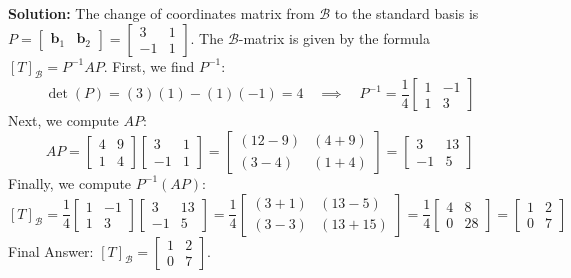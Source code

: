 \documentclass[11pt, a4paper]{article}
\theoremstyle{definition}
\theoremstyle{remark}
\begin{document}
\textbf{Solution:}
The change of coordinates matrix from $\mathcal{B}$ to the standard basis is $P = \begin{bmatrix} \mathbf{b}_1 & \mathbf{b}_2 \end{bmatrix} = \begin{bmatrix} 3 & 1 \\ -1 & 1 \end{bmatrix}$.
The $\mathcal{B}$-matrix is given by the formula $[T]_\mathcal{B} = P^{-1}AP$.
First, we find $P^{-1}$:
\[
\det(P) = (3)(1) - (1)(-1) = 4 \quad \implies \quad P^{-1} = \frac{1}{4} \begin{bmatrix} 1 & -1 \\ 1 & 3 \end{bmatrix}
\]
Next, we compute $AP$:
\[
AP = \begin{bmatrix} 4 & 9 \\ 1 & 4 \end{bmatrix} \begin{bmatrix} 3 & 1 \\ -1 & 1 \end{bmatrix} = \begin{bmatrix} (12 - 9) & (4 + 9) \\ (3 - 4) & (1 + 4) \end{bmatrix} = \begin{bmatrix} 3 & 13 \\ -1 & 5 \end{bmatrix}
\]
Finally, we compute $P^{-1}(AP)$:
\[
[T]_\mathcal{B} = \frac{1}{4} \begin{bmatrix} 1 & -1 \\ 1 & 3 \end{bmatrix} \begin{bmatrix} 3 & 13 \\ -1 & 5 \end{bmatrix} = \frac{1}{4} \begin{bmatrix} (3 + 1) & (13 - 5) \\ (3 - 3) & (13 + 15) \end{bmatrix} = \frac{1}{4} \begin{bmatrix} 4 & 8 \\ 0 & 28 \end{bmatrix} = \begin{bmatrix} 1 & 2 \\ 0 & 7 \end{bmatrix}
\]
Final Answer: $[T]_\mathcal{B} = \begin{bmatrix} 1 & 2 \\ 0 & 7 \end{bmatrix}$.
\end{document}
